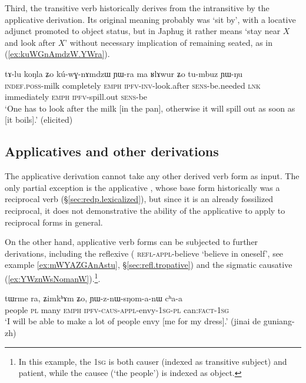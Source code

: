 Third, the transitive verb  historically derives from the intransitive  by the applicative derivation. Its original meaning probably was `sit by', with a locative adjunct promoted to object status, but in Japhug it rather means `stay near $X$ and look after $X$' without necessary implication of remaining seated, as in (\ref{ex:kuWGnAmdzW.YWra}).

\begin{exe}
\ex \label{ex:kuWGnAmdzW.YWra}
\gll tɤ-lu koŋla ʑo kú-wɣ-nɤmdzɯ ɲɯ-ra ma ʁlɤwur ʑo tu-mbuz ɲɯ-ŋu \\
\textsc{indef}.\textsc{poss}-milk completely \textsc{emph} \textsc{ipfv}-\textsc{inv}-look.after \textsc{sens}-be.needed \textsc{lnk} immediately \textsc{emph} \textsc{ipfv}-spill.out \textsc{sens}-be \\
\glt `One has to look after the milk [in the pan], otherwise it will spill out as soon as [it boils].' (elicited)
\end{exe}
 
 
\subsection{Applicatives and other derivations} \label{sec:appl.other.derivations}
The applicative derivation cannot take any other derived verb form as input. The only partial exception is the applicative , whose base form  historically was a reciprocal verb (§\ref{sec:redp.lexicalized}), but since it is an already fossilized reciprocal, it does not demonstrative the ability of the applicative to apply to reciprocal forms in general.

On the other hand, applicative verb forms can be subjected to further derivations, including the reflexive  ( \textsc{refl}-\textsc{appl}-believe `believe in oneself', see example \ref{ex:mWYAZGAnAstu}, §\ref{sec:refl.tropative}) and the sigmatic causative (\ref{ex:YWznWsNomanW}).\footnote{In this example, the \textsc{1sg} is both causer (indexed as transitive subject) and patient, while the causee (`the people') is indexed as object. }. 

\begin{exe}
\ex \label{ex:YWznWsNomanW}
\gll tɯrme ra, ʑimkʰɤm ʑo, ɲɯ-z-nɯ-sŋom-a-nɯ cʰa-a \\
people \textsc{pl} many \textsc{emph} \textsc{ipfv}-\textsc{caus}-\textsc{appl}-envy-\textsc{1sg}-\textsc{pl} can:\textsc{fact}-\textsc{1sg} \\
\glt `I will be able to make a lot of people envy [me for my dress].' (jinai de guniang-zh)
\end{exe}

